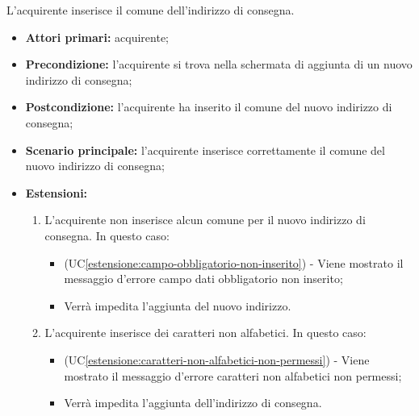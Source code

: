 L'acquirente inserisce il comune dell'indirizzo di consegna.
\begin{itemize}
    \item \textbf{Attori primari:} acquirente;
    \item \textbf{Precondizione:} l'acquirente si trova nella schermata di aggiunta di un nuovo indirizzo di consegna;
    \item \textbf{Postcondizione:} l'acquirente ha inserito il comune del nuovo indirizzo di consegna;
    \item \textbf{Scenario principale:} l'acquirente inserisce correttamente il comune del nuovo indirizzo di consegna;
    \item \textbf{Estensioni:}
    \begin{enumerate}[label=\lett]
        \item L'acquirente non inserisce alcun comune per il nuovo indirizzo di consegna. In questo caso:
        \begin{itemize}
            \item (UC\ref{estensione:campo-obbligatorio-non-inserito}) - Viene mostrato il messaggio d'errore campo dati obbligatorio non inserito;
            \item Verrà impedita l'aggiunta del nuovo indirizzo.
        \end{itemize}
        \item L'acquirente inserisce dei caratteri non alfabetici. In questo caso:
        \begin{itemize}
            \item (UC\ref{estensione:caratteri-non-alfabetici-non-permessi}) - Viene mostrato il messaggio d'errore caratteri non alfabetici non permessi;
            \item Verrà impedita l'aggiunta dell'indirizzo di consegna.
        \end{itemize}
    \end{enumerate}
\end{itemize}

\label{inserimento-indirizzo-consegna.modulo.via}

